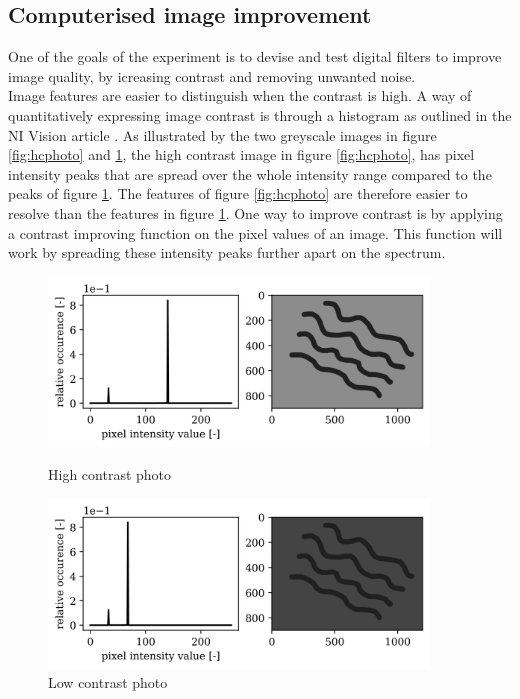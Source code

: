 \subsection{Computerised image improvement}
One of the goals of the experiment is to devise and test digital filters to improve image quality, by icreasing contrast and removing unwanted noise.\\
Image features are easier to distinguish when the contrast is high. A way of quantitatively expressing image contrast is through a histogram as outlined in the NI Vision article \cite{histogram_theory}. As illustrated by the two greyscale images in figure \ref{fig:hcphoto} and \ref{fig:lcphoto}, the high contrast image in figure \ref{fig:hcphoto}, has pixel intensity peaks that are spread over the whole intensity range compared to the peaks of figure \ref{fig:lcphoto}. The features of figure \ref{fig:hcphoto} are therefore easier to resolve than the features in figure \ref{fig:lcphoto}. One way to improve contrast is by applying a contrast improving function on the pixel values of an image. This function will work by spreading these intensity peaks further apart on the spectrum.\\

\begin{figure}[h!]
    \centering
    \begin{minipage}{.5\textwidth}
      \centering
      \includegraphics[width=0.9\textwidth,keepaspectratio]{afbeeldingen/histograms/highcontrast.png}
      \caption{High contrast photo}
      \label{fig:hcphoto}
    \end{minipage}%
    \begin{minipage}{.5\textwidth}
      \centering
      \includegraphics[width=0.9\textwidth,keepaspectratio]{afbeeldingen/histograms/lowcontrast.png}
      \caption{Low contrast photo}
      \label{fig:lcphoto}
    \end{minipage}
\end{figure}


